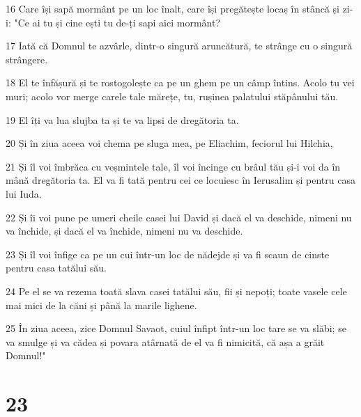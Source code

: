 \par 16 Care își sapă mormânt pe un loc înalt, care își pregătește locaș în stâncă și zi-i: "Ce ai tu și cine ești tu de-ți sapi aici mormânt?
\par 17 Iată că Domnul te azvârle, dintr-o singură aruncătură, te strânge cu o singură strângere.
\par 18 El te înfășură și te rostogolește ca pe un ghem pe un câmp întins. Acolo tu vei muri; acolo vor merge carele tale mărețe, tu, rușinea palatului stăpânului tău.
\par 19 El îți va lua slujba ta și te va lipsi de dregătoria ta.
\par 20 Și în ziua aceea voi chema pe sluga mea, pe Eliachim, feciorul lui Hilchia,
\par 21 Și îl voi îmbrăca cu veșmintele tale, îl voi încinge cu brâul tău și-i voi da în mână dregătoria ta. El va fi tată pentru cei ce locuiesc în Ierusalim și pentru casa lui Iuda.
\par 22 Și îi voi pune pe umeri cheile casei lui David și dacă el va deschide, nimeni nu va închide, și dacă el va închide, nimeni nu va deschide.
\par 23 Și îl voi înfige ca pe un cui într-un loc de nădejde și va fi scaun de cinste pentru casa tatălui său.
\par 24 Pe el se va rezema toată slava casei tatălui său, fii și nepoți; toate vasele cele mai mici de la căni și până la marile lighene.
\par 25 În ziua aceea, zice Domnul Savaot, cuiul înfipt într-un loc tare se va slăbi; se va smulge și va cădea și povara atârnată de el va fi nimicită, că așa a grăit Domnul!"

\chapter{23}

